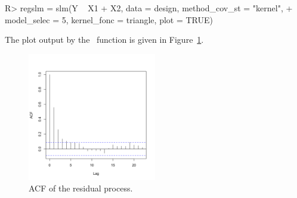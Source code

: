 \begin{Schunk}
\begin{Sinput}
R> regslm = slm(Y ~ X1 + X2, data = design, method_cov_st = "kernel",
+  	model_selec = 5, kernel_fonc = triangle, plot = TRUE)
\end{Sinput}
\end{Schunk}
The plot output by the \slmf~function is given in Figure~\ref{fig:ACFKernel5}.
\begin{figure}[h!]
\begin{center}
\includegraphics[width=0.5\textwidth]{figures/article_kernelfig.png}
\caption{ACF of the residual process.}
\label{fig:ACFKernel5}
\end{center}
\end{figure}

